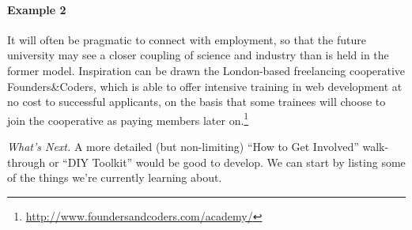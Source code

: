 \begin{refsection}
\paragraph{Example 2} It will often be pragmatic to connect
 with employment, so that the future
university may see a closer coupling of science and industry than is
held in the former model.  Inspiration can be drawn the London-based freelancing cooperative Founders\&Coders, which is
able to offer intensive training in web development at no cost to
successful applicants, on the basis that some trainees will choose to
join the cooperative as paying members later
on.\footnote{\url{http://www.foundersandcoders.com/academy/}}


\begin{framed}
\noindent 
\emph{What's Next.}
A more detailed (but non-limiting) ``How to Get Involved'' walk-through or ``DIY Toolkit'' would be good to develop. We can start by listing some of the things we're currently learning about.
\end{framed}

\printbibliography[heading=subbibliography]
\end{refsection}
